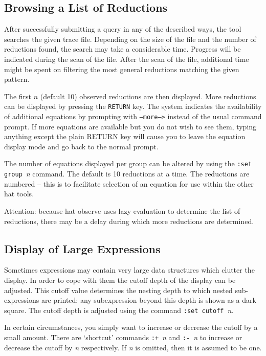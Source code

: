\documentclass[12pt]{article}
\newcommand{\com}[1]{\texttt{#1}}
\begin{document}
\subsection{Browsing a List of Reductions}

After successfully submitting a query in any of the described ways,
the tool searches the given trace file. Depending on the size of
the file and the number of reductions found, the search may take a
considerable time. Progress will be indicated during the scan of the
file. After the scan of the file, additional time might be spent on
filtering the most general reductions matching
the given pattern.

The first $n$ (default 10) observed reductions are then displayed.
More reductions can be displayed by pressing the \texttt{RETURN} key.
The system indicates the availability of additional equations by
prompting with \texttt{--more-->} instead of the usual command prompt.
If more equations are available but you do not wish to see them,
typing anything except the plain RETURN key will cause you to leave
the equation display mode and go back to the normal prompt.

The number of equations displayed per group can be altered by using
the \com{:set group}~\emph{n} command.  The default is 10 reductions at
a time.  The reductions are numbered -- this is to facilitate selection
of an equation for use within the other hat tools.

Attention: because hat-observe uses lazy evaluation to determine the
list of reductions, there may be a delay during which more reductions
are determined.


\subsection{Display of Large Expressions}

Sometimes expressions may contain very large data structures which
clutter the display.  In order to cope with them the cutoff depth of
the display can be adjusted.  This cutoff value determines the nesting
depth to which nested sub-expressions are printed: any subexpression
beyond this depth is shown as a dark square.  The cutoff depth is
adjusted using the command \com{:set cutoff}~\emph{n}.

In certain circumstances, you simply want to increase or decrease
the cutoff by a small amount.  There are `shortcut' commands
\com{:+}~\emph{n} and \com{:-}~\emph{n} to increase or decrease the
cutoff by \emph{n} respectively.  If \emph{n} is omitted, then
it is assumed to be one.
\end{document}
